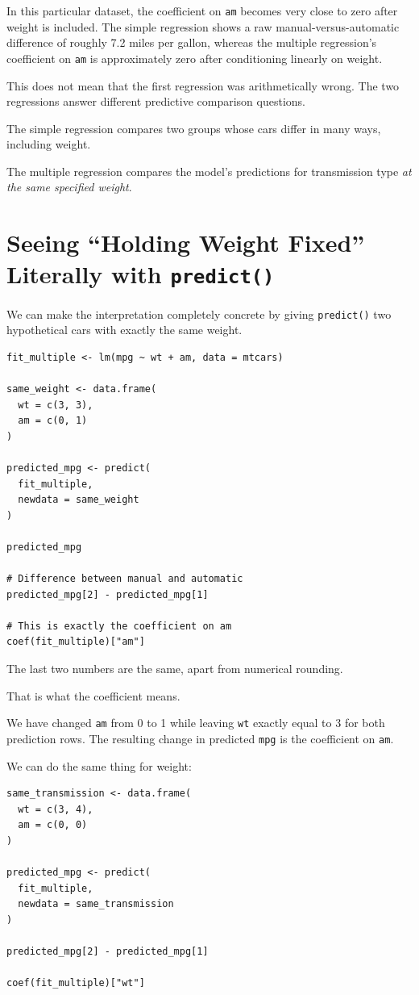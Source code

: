\documentclass[11pt]{report}
\begin{document}
In this particular dataset, the coefficient on \texttt{am} becomes very close to zero after weight is included. The simple regression shows a raw manual-versus-automatic difference of roughly 7.2 miles per gallon, whereas the multiple regression's coefficient on \texttt{am} is approximately zero after conditioning linearly on weight.

This does not mean that the first regression was arithmetically wrong. The two regressions answer different predictive comparison questions.

The simple regression compares two groups whose cars differ in many ways, including weight.

The multiple regression compares the model's predictions for transmission type \emph{at the same specified weight}.

\section{Seeing ``Holding Weight Fixed'' Literally with \texttt{predict()}}

We can make the interpretation completely concrete by giving \texttt{predict()} two hypothetical cars with exactly the same weight.

\begin{lstlisting}
fit_multiple <- lm(mpg ~ wt + am, data = mtcars)

same_weight <- data.frame(
  wt = c(3, 3),
  am = c(0, 1)
)

predicted_mpg <- predict(
  fit_multiple,
  newdata = same_weight
)

predicted_mpg

# Difference between manual and automatic
predicted_mpg[2] - predicted_mpg[1]

# This is exactly the coefficient on am
coef(fit_multiple)["am"]
\end{lstlisting}

The last two numbers are the same, apart from numerical rounding.

That is what the coefficient means.

We have changed \texttt{am} from 0 to 1 while leaving \texttt{wt} exactly equal to 3 for both prediction rows. The resulting change in predicted \texttt{mpg} is the coefficient on \texttt{am}.

We can do the same thing for weight:

\begin{lstlisting}
same_transmission <- data.frame(
  wt = c(3, 4),
  am = c(0, 0)
)

predicted_mpg <- predict(
  fit_multiple,
  newdata = same_transmission
)

predicted_mpg[2] - predicted_mpg[1]

coef(fit_multiple)["wt"]
\end{lstlisting}
\end{document}

